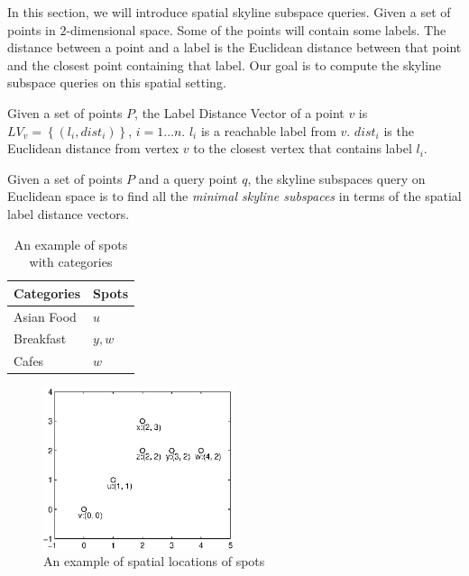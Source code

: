 In this section, we will introduce spatial skyline subspace queries. Given a set of points in $2$-dimensional space. Some of the points will contain some labels. The distance between a point and a label is the Euclidean distance between that point and the closest point containing that label. Our goal is to compute the skyline subspace queries on this spatial setting.

\begin{definition}
Given a set of points $P$, the Label Distance Vector of a point $v$ is $LV_v=\left\{\left(l_i, dist_i\right)\right\}$, $i = 1 \ldots n$. $l_i$ is a reachable label from $v$. $dist_i$ is the Euclidean distance from vertex $v$ to the closest vertex that contains label $l_i$.
\end{definition}

\begin{definition}
Given a set of points $P$ and a query point $q$, the skyline subspaces query on Euclidean space is to find all the \emph{minimal skyline subspaces} in terms of the spatial label distance vectors.
\end{definition}

\begin{table}[h]
    \centering
    \begin{tabular}{|l|l|}
    \hline
    Categories     & Spots \\ \hline
    Asian Food     & $u$     \\ \hline
    Breakfast      & $y, w$  \\ \hline
    Cafes          & $w$     \\ \hline
    \end{tabular}
    \caption{An example of spots with categories}
    \label{tab:spot_category} 
\end{table}


\begin{figure}[h]
    \centering
    \includegraphics[width=0.5\textwidth]{figs/spatial_figure}
    \caption{An example of spatial locations of spots}
    \label{fig:spatial_map}
\end{figure}

